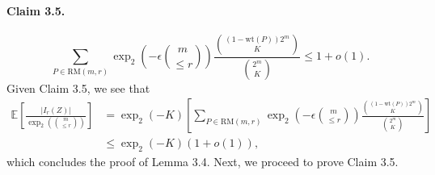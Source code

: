 \paragraph{Claim 3.5.}
\[\sum_{P\in\mathrm{RM}(m,r)}\operatorname{exp}_2\left(-\epsilon\binom m{\le r}\right)\frac{\binom{(1-\mathrm{wt}(P))2^m}K}{\binom{2^m}K}\le1+o(1).\]
Given Claim 3.5, we see that
\begin{align*}\mathbb E\left[\frac{|I_r(Z)|}{\operatorname{exp}_2\left(\binom m{\le r}\right)}\right]&=\operatorname{exp}_2(-K)\left[\sum_{P\in\mathrm{RM}(m,r)}\operatorname{exp}_2\left(-\epsilon\binom m{\le r}\right)\frac{\binom{(1-\mathrm{wt}(P))2^m}K}{\binom{2^m}K}\right]\\&\le\operatorname{exp}_2(-K)(1+o(1)),\end{align*}
which concludes the proof of Lemma 3.4. Next, we proceed to prove Claim 3.5.
